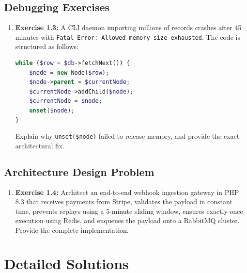 \subsection{Debugging Exercises}
\begin{enumerate}
  \item \textbf{Exercise 1.3:} A CLI daemon importing millions of records crashes after 45 minutes with \texttt{Fatal Error: Allowed memory size exhausted}. The code is structured as follows:
\begin{lstlisting}[language=PHP]
while ($row = $db->fetchNext()) {
    $node = new Node($row);
    $node->parent = $currentNode;
    $currentNode->addChild($node);
    $currentNode = $node;
    unset($node);
}
\end{lstlisting}
Explain why \texttt{unset(\$node)} failed to release memory, and provide the exact architectural fix.
\end{enumerate}

\subsection{Architecture Design Problem}
\begin{enumerate}
  \item \textbf{Exercise 1.4:} Architect an end-to-end webhook ingestion gateway in PHP 8.3 that receives payments from Stripe, validates the payload in constant time, prevents replays using a 5-minute sliding window, ensures exactly-once execution using Redis, and enqueues the payload onto a RabbitMQ cluster. Provide the complete implementation.
\end{enumerate}

\section{Detailed Solutions}

